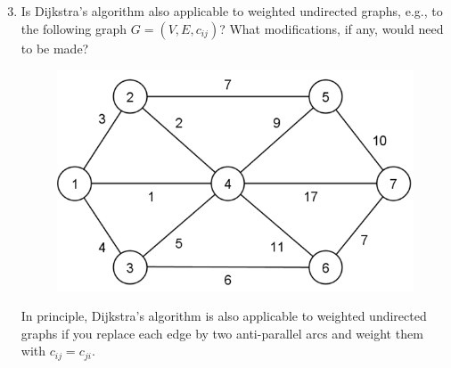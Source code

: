 \begin{enumerate}
\setcounter{enumi}{2}
	\item Is Dijkstra's algorithm also applicable to weighted undirected graphs, e.g., to the following graph $G = (V,E,c_{ij})$? What modifications, if any, would need to be made?
\begin{figure}[h]%
\centering
\includegraphics[scale=.4]{Uebungen/figures/Graph}
\end{figure}
	\begin{solution}
	In principle, Dijkstra's algorithm is also applicable to weighted undirected graphs if you replace each edge by two anti-parallel arcs and weight them with $c_{ij}=c_{ji}$.
	\end{solution}


\end{enumerate}
